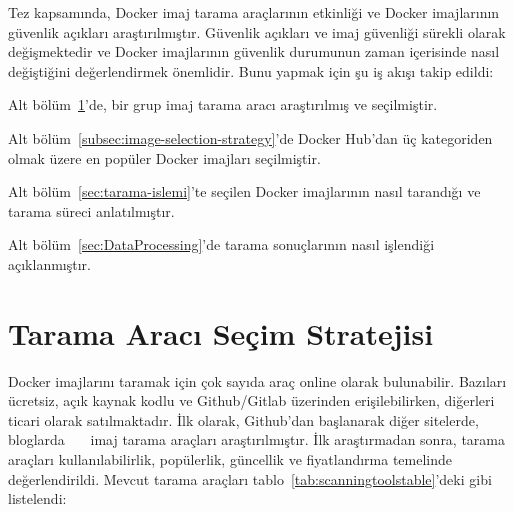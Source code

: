 Tez kapsamında, Docker imaj tarama araçlarının etkinliği ve Docker imajlarının güvenlik açıkları araştırılmıştır. Güvenlik açıkları ve imaj güvenliği sürekli olarak değişmektedir ve Docker imajlarının güvenlik durumunun zaman içerisinde nasıl değiştiğini değerlendirmek önemlidir. Bunu yapmak için şu iş akışı takip edildi:

\begin{maddelendir}[label=$\bullet$]
    \item Alt bölüm~\ref{subsec:scanner-tool-selection}'de, bir grup imaj tarama aracı araştırılmış ve seçilmiştir.
    \item Alt bölüm~\ref{subsec:image-selection-strategy}'de Docker Hub'dan üç kategoriden olmak üzere en popüler Docker imajları seçilmiştir.
    \item Alt bölüm~\ref{sec:tarama-islemi}'te seçilen Docker imajlarının nasıl tarandığı ve tarama süreci anlatılmıştır.
    \item Alt bölüm~\ref{sec:DataProcessing}'de tarama sonuçlarının nasıl işlendiği açıklanmıştır.
\end{maddelendir}

\section{Tarama Aracı Seçim Stratejisi}\label{subsec:scanner-tool-selection}

Docker imajlarını taramak için çok sayıda araç online olarak bulunabilir. Bazıları ücretsiz, açık kaynak kodlu ve Github/Gitlab üzerinden erişilebilirken, diğerleri ticari olarak satılmaktadır. İlk olarak, Github'dan başlanarak diğer sitelerde, bloglarda~\autocite{TechbeaconDockersecurity}~\autocite{5opensourcetools}~\autocite{geekflare11Container} imaj tarama araçları araştırılmıştır. İlk araştırmadan sonra, tarama araçları kullanılabilirlik, popülerlik, güncellik ve fiyatlandırma temelinde değerlendirildi. Mevcut tarama araçları tablo~\ref{tab:scanningtoolstable}'deki gibi listelendi:

